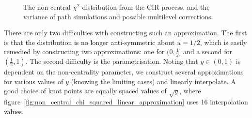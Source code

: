 \documentclass[9pt,a4paper,english]{extarticle}
\begin{document}
\begin{figure}[htb]
\centering

\hfil
{}\hfil
{}\hfil
 
\caption{The non-central $ \chi^2 $ distribution from the CIR process, and the variance of path simulations and possible multilevel corrections.}
\label{fig:cir_process}

\end{figure}

There are only two difficulties with constructing such an approximation. The first is that the distribution is no longer anti-symmetric about $ u=1/2$, which is easily remedied by constructing two approximations: one for $ (0, \tfrac{1}{2}] $ and a second for $ (\tfrac{1}{2}, 1) $. The second difficulty is the parametrisation. Noting that $ y \in (0, 1) $ is dependent on the non-centrality parameter, we construct several approximations for various values of $ y $ (knowing the limiting cases) and linearly interpolate. A good choice of knot points are equally spaced values of $ \sqrt{y} $, where figure~\ref{fig:non_central_chi_squared_linear_approximation} uses 16 interpolation values.
\end{document}
